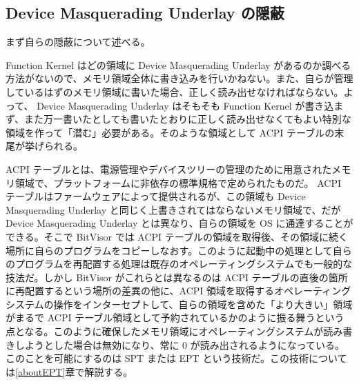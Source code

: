 \documentclass[a4paper,11pt,report]{ltjsbook}
\begin{document}
\subsection{Device Masquerading Underlay の隠蔽}

まず自らの隠蔽について述べる。

Function Kernel はどの領域に Device Masquerading Underlay があるのか調べる方法がないので、メモリ領域全体に書き込みを行いかねない。また、自らが管理しているはずのメモリ領域に書いた場合、正しく読み出せなければならない。よって、 Device Masquerading Underlay はそもそも Function Kernel が書き込まず、また万一書いたとしても書いたとおりに正しく読み出せなくてもよい特別な領域を作って「潜む」必要がある。そのような領域として ACPI テーブルの末尾が挙げられる。

ACPI テーブルとは、電源管理やデバイスツリーの管理のために用意されたメモリ領域で、プラットフォームに非依存の標準規格で定められたものだ。 ACPI テーブルはファームウェアによって提供されるが、この領域も Device Masquerading Underlay と同じく上書きされてはならないメモリ領域で、だが Device Masquerading Underlay とは異なり、自らの領域を OS に通達することができる。そこで BitVisor では ACPI テーブルの領域を取得後、その領域に続く場所に自らのプログラムをコピーしなおす。このように起動中の処理として自らのプログラムを再配置する処理は既存のオペレーティングシステムでも一般的な技法だ。しかし BitVisor がこれらとは異なるのは ACPI テーブルの直後の箇所に再配置するという場所の差異の他に、ACPI 領域を取得するオペレーティングシステムの操作をインターセプトして、自らの領域を含めた「より大きい」領域がまるで ACPI テーブル領域として予約されているかのように振る舞うという点となる。このように確保したメモリ領域にオペレーティングシステムが読み書きしようとした場合は無効になり、常に 0 が読み出されるようになっている。このことを可能にするのは SPT または EPT という技術だ。この技術については\ref{aboutEPT}章で解説する。
\end{document}
